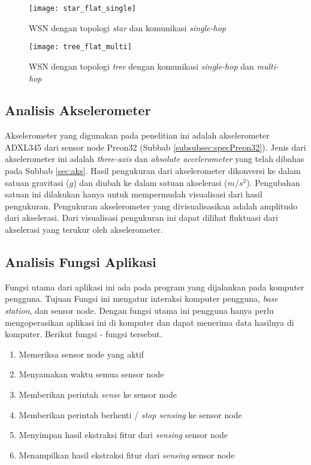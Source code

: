 		\begin{figure}[H]
			\centering  
			\texttt{[image: star\_flat\_single]}  
			\caption[WSN dengan topologi {\it star} dengan komunikasi {\it single-hop}]{WSN dengan topologi {\it star} dan komunikasi {\it single-hop}} 
			\label{fig:star_flat_single} 
		\end{figure} 
		
		\begin{figure}[H]
			\centering  
			\texttt{[image: tree\_flat\_multi]}  
			\caption[WSN dengan topologi {\it tree} dengan komunikasi {\it single-hop} dan {\it multi-hop}]{WSN dengan topologi {\it tree} dengan komunikasi {\it single-hop} dan {\it multi-hop} }
			\label{fig:tree_flat_multi} 
		\end{figure} 

\subsection{Analisis Akselerometer}
\label{subsec:akselerometer}
Akselerometer yang digunakan pada penelitian ini adalah akselerometer ADXL345 dari sensor node Preon32 (Subbab \ref{subsubsec:specPreon32}). Jenis dari akselerometer ini adalah {\it three-axis} dan {\it absolute accelerometer} yang telah dibahas pada Subbab \ref{sec:aks}. Hasil pengukuran dari akselerometer dikonversi ke dalam satuan gravitasi ($g$) dan diubah ke dalam satuan akselerasi ($m/s^2$). Pengubahan satuan ini dilakukan hanya untuk mempermudah visualisasi dari hasil pengukuran. Pengukuran akselerometer
yang divisualisasikan adalah amplitudo dari akselerasi. Dari visualisasi pengukuran ini dapat dilihat fluktuasi dari akselerasi yang terukur oleh akselerometer. 

\subsection{Analisis Fungsi Aplikasi}
\label{subsec:analisisFungsi}
Fungsi utama dari aplikasi ini ada pada program yang dijalankan pada komputer pengguna. Tujuan Fungsi ini mengatur interaksi komputer pengguna, {\it base station}, dan sensor node. Dengan fungsi utama ini pengguna hanya perlu mengoperasikan aplikasi ini di komputer dan dapat menerima data hasilnya di komputer. Berikut fungsi - fungsi tersebut.
\begin{enumerate}
\item Memeriksa sensor node yang aktif 
\item Menyamakan waktu semua sensor node
\item Memberikan perintah {\it sense} ke sensor node 
\item Memberikan perintah berhenti / {\it stop sensing} ke sensor node
\item Menyimpan hasil ekstraksi fitur dari {\it sensing} sensor node
\item Menampilkan hasil ekstraksi fitur dari {\it sensing} sensor node
\end{enumerate}

